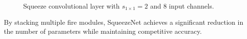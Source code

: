 \begin{figure}[H]
    \centering
    \resizebox{.7\textwidth}{!}{}
    \captionsetup{width=0.94\linewidth}
    \caption{Squeeze convolutional layer with $s_{1\!\times\!1}=2$ and 8 input channels.\label{fig:squeeze}}
\end{figure}


\noindent
By stacking multiple fire modules, SqueezeNet achieves a significant reduction in the number of parameters while
maintaining competitive accuracy. 

